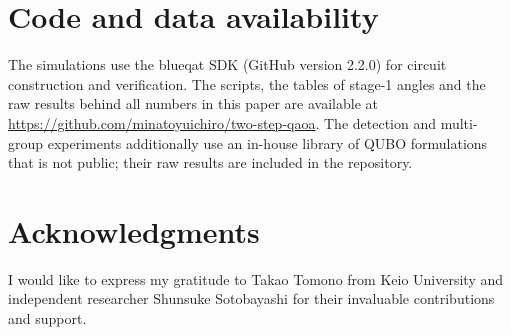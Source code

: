 \documentclass{article}
\begin{document}
\section*{Code and data availability}
The simulations use the blueqat SDK (GitHub version 2.2.0) for circuit construction and verification. The scripts, the tables of stage-1 angles and the raw results behind all numbers in this paper are available at \url{https://github.com/minatoyuichiro/two-step-qaoa}. The detection and multi-group experiments additionally use an in-house library of QUBO formulations that is not public; their raw results are included in the repository.

\section*{Acknowledgments}
I would like to express my gratitude to Takao Tomono from Keio University and independent researcher Shunsuke Sotobayashi for their invaluable contributions and support.



\end{document}
